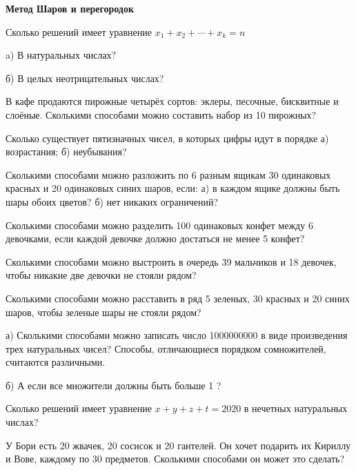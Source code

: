 \centerline{\bf \Huge Метод Шаров и перегородок}
\centerline{\bf \Huge }

\begin{flushright}
        \scriptsize{}
\end{flushright}


Сколько решений имеет уравнение $x_1+x_2+\cdots+x_k=n$

a) В натуральных числах?

б) В целых неотрицательных числах?

В кафе продаются пирожные четырёх сортов: эклеры, песочные, бисквитные и слоёные. Сколькими способами можно составить набор из 10 пирожных?

Сколько существует пятизначных чисел, в которых цифры идут в порядке а) возрастания; б) неубывания?

Сколькими способами можно разложить по 6 разным ящикам 30 одинаковых красных и 20 одинаковых синих шаров, если: а) в каждом ящике должны быть шары обоих цветов? б) нет никаких ограничений?

Сколькими способами можно разделить 100 одинаковых конфет между 6 девочками, если каждой девочке должно достаться не менее 5 конфет?

Сколькими способами можно выстроить в очередь 39 мальчиков и 18 девочек, чтобы никакие две девочки не стояли рядом?

Сколькими способами можно расставить в ряд 5 зеленых, 30 красных и 20 синих шаров, чтобы зеленые шары не стояли рядом?

а) Сколькими способами можно записать число 1000000000 в виде произведения трех натуральных чисел? Способы, отличающиеся порядком сомножителей, считаются различными.

\noindent
б) А если все множители должны быть больше 1 ?

Сколько решений имеет уравнение $x+y+z+t=2020$ в нечетных натуральных числах?

У Бори есть 20 жвачек, 20 сосисок и 20 гантелей. Он хочет подарить их Кириллу и Вове, каждому по 30 предметов. Сколькими способами он может это сделать?